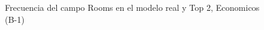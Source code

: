 \begin{figure}[H]
    \centering
    
    \caption{Frecuencia del campo Rooms en el modelo real y Top 2, Economicos (B-1)}
    \label{frecuency-Rooms-top2}
\end{figure}